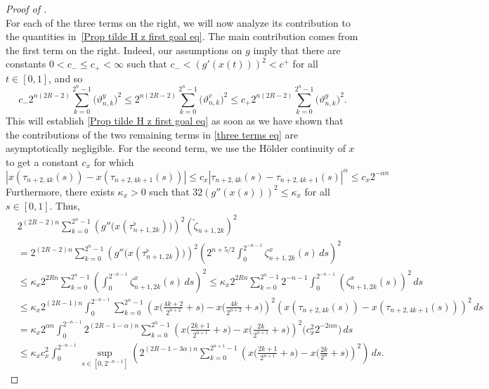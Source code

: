 \documentclass[12pt,reqno]{article}
\def\wt{\widetilde}
\numberwithin{equation}{section}
\theoremstyle{definition}
\def\wt#1{\widetilde{#1}}
\def\wt{\widetilde}
\begin{document}
\begin{proof}[Proof of ]
\begin{equation}
	\end{equation}
	For each of the three terms on the right,  we will now analyze its contribution to the quantities in~\eqref{Prop tilde H z first goal eq}. 
	The main contribution comes from the first term on the right.	Indeed, our assumptions on $g$ imply that there are constants $0<c_-\le c_+<\infty$ such that $c_-<(g'(x(t)))^2<c^+$ for all $t\in[0,1]$, and so 	
	$$c_-2^{n(2{R}-2)}\sum_{k = 0}^{2^{n}-1}\big(\vartheta^y_{n,k}\big)^2\le 2^{n(2{R}-2)}\sum_{k = 0}^{2^{n}-1}\big(\vartheta^v_{n,k}\big)^2\le c_+2^{n(2{R}-2)}\sum_{k = 0}^{2^{n}-1}\big(\vartheta^y_{n,k}\big)^2.
	$$
	This will establish \eqref{Prop tilde H z first goal eq} as soon as
	we have shown that the contributions of the two remaining terms in \eqref{three terms eq} are asymptotically negligible.	For the second term, we use the H\"older continuity of $x$ to get a constant $c_x$ for which
	\begin{equation*}
		|x(\tau_{n+2,4k}(s))-x(\tau_{n+2,4k+1}(s))| \le c_x|\tau_{n+2,4k}(s) - \tau_{n+2,4k+1}(s)|^\alpha \le c_x2^{-\alpha n}
	\end{equation*}
	Furthermore,  there exists $\kappa_x > 0$ such that $32 (g''(x(s)))^2 \le \kappa_x$ for all $s\in[0,1]$. Thus,
	\begin{equation*}
		\begin{split}
			&2^{(2{R}-2)n}\sum_{k = 0}^{2^{n}-1}\left(g''\big(x(\tau^\flat_{n+1,2k})\big)\right)^2\left(\wt\zeta_{n+1,2k}
			\right)^2 \\
			&= 2^{(2{R}-2)n}\sum_{k = 0}^{2^{n}-1}\left(g''\big(x(\tau^\flat_{n+1,2k})\big)\right)^2\left(2^{n+5/2}\int_{0}^{2^{-n-1}}\zeta^{x}_{n+1,2k}(s)\,ds\right)^2\\
			&\le \kappa_x 2^{2{R}n}\sum_{k = 0}^{2^{n}-1}\left(\int_{0}^{2^{-n-1}}\zeta^{x}_{n+1,2k}(s)\,ds\right)^2 \le \kappa_x 2^{2{R}n}\sum_{k = 0}^{2^{n}-1}2^{-n-1}\int_{0}^{2^{-n-1}}\left(\zeta^{x}_{n+1,2k}(s)\right)^2\,ds \\
			&\le \kappa_x 2^{(2{R}-1)n}\int_{0}^{2^{-n-1}}\sum_{k = 0}^{2^{n}-1}\left(x\Big(\frac{4k+2}{2^{n+2}}+s\Big)-x\Big(\frac{4k}{2^{n+2}}+s\Big)\right)^2\left(x(\tau_{n+2,4k}(s))-x(\tau_{n+2,4k+1}(s))\right)^2\,ds \\
			&= \kappa_x 2^{\alpha n}\int_{0}^{2^{-n-1}}2^{(2{R}-1-\alpha)n}\sum_{k = 0}^{2^{n}-1}\left(x\Big(\frac{2k+1}{2^{n+1}}+s\Big)-x\Big(\frac{2k}{2^{n+1}}+s\Big)\right)^2\big(c^2_x2^{-2\alpha n}\big)\,ds \\
			&\le \kappa_x c^2_x \int_{0}^{2^{-n-1}}\sup_{s \in [0,2^{-n-1}]}\left(2^{(2{R}-1-3\alpha)n}\sum_{k = 0}^{2^{n+1}-1}\left(x\Big(\frac{2k+1}{2^{n+1}}+s\Big)-x\Big(\frac{2k}{2^{n}}+s\Big)\right)^2\right)\,ds.	\end{split}

\end{equation*}
\end{proof}
\end{document}
